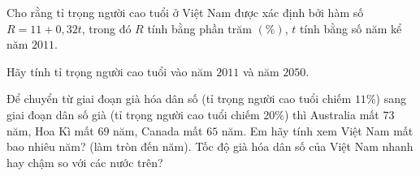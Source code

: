 \begin{bt}%
Cho rằng tỉ trọng người cao tuổi ở Việt Nam được xác định bởi hàm số $R=11+0,32t$, trong đó $R$ tính bằng phần trăm $(\%)$, $t$ tính bằng số năm kể năm $2011$.
\begin{listEX}
\item Hãy tính tỉ trọng người cao tuổi vào năm $2011$ và năm $2050$.
\item Để chuyển từ giai đoạn già hóa dân số (tỉ trọng người cao tuổi chiếm $11\%$) sang giai đoạn dân số già (tỉ trọng người cao tuổi chiếm $20\%$) thì Australia mất $73$ năm, Hoa Kì mất $69$ năm, Canada mất $65$ năm. Em hãy tính xem Việt Nam mất bao nhiêu năm? (làm tròn đến năm). Tốc độ già hóa dân số của Việt Nam nhanh hay chậm so với các nước trên?
\end{listEX}
\end{bt}
